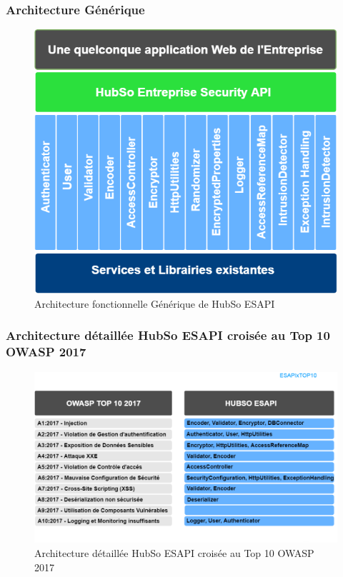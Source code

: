 \subsubsection{Architecture Générique}
\begin{figure}[H]
	\centering
	\begin{minipage}{12cm}
		\centering
		\includegraphics[width=0.7\linewidth]{parts/part04/chapters/conception/fig/ArchitectureFonctionnelleHubSoESAPI}
	\end{minipage}
		\caption{Architecture fonctionnelle Générique de HubSo ESAPI}
		\label{fig:architecturefonctionnellehubsoesapi}
\end{figure}
\subsubsection{Architecture détaillée HubSo ESAPI croisée au Top 10 OWASP 2017}
\begin{figure}[H]
	\centering
	\begin{minipage}{12cm}
		\centering
		\includegraphics[width=0.7\linewidth,height=0.25\textheight]{parts/part04/chapters/conception/fig/EsapiXtop10}
	\end{minipage}
	\caption{Architecture détaillée HubSo ESAPI croisée au Top 10 OWASP 2017}
	\label{fig:architecturedet}
\end{figure}
